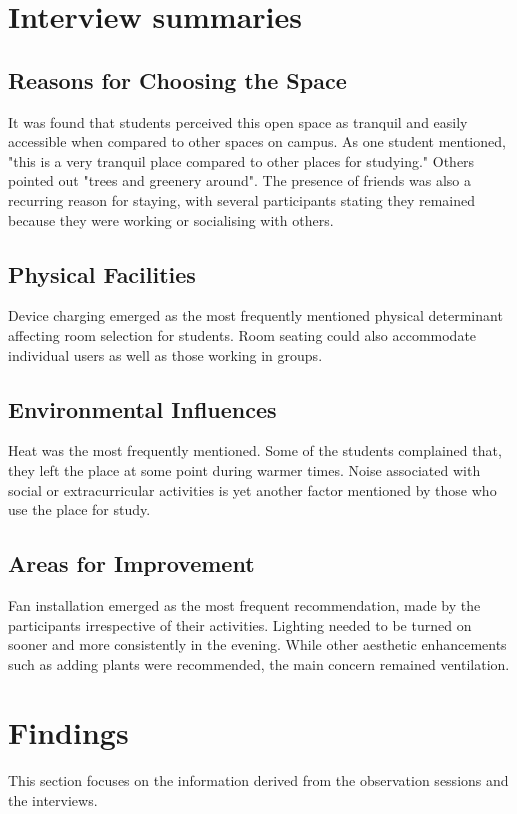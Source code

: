 \documentclass[12pt]{report}
\begin{document}
\chapter{Interview summaries}

\section{Reasons for Choosing the Space}
It was found that students perceived this open space as tranquil and easily accessible when compared to other spaces on campus. As one student mentioned, "this is a very tranquil place compared to other places for studying." Others pointed out "trees and greenery around". The presence of friends was also a recurring reason for staying, with several participants stating they remained because they were working or socialising with others.


\section{Physical Facilities}
Device charging emerged as the most frequently mentioned physical determinant affecting room selection for students. Room seating could also accommodate individual users as well as those working in groups.

\section{Environmental Influences}
Heat was the most frequently mentioned. Some of the students complained that, they left the place at some point during warmer times. Noise associated with social or extracurricular activities is yet another factor mentioned by those who use the place for study.

\section{Areas for Improvement}
Fan installation emerged as the most frequent recommendation, made by the participants irrespective of their activities. Lighting needed to be turned on sooner and more consistently in the evening. While other aesthetic enhancements such as adding plants were recommended, the main concern remained ventilation.

\chapter{Findings}
This section focuses on the information derived from the observation sessions and the interviews.
\end{document}
